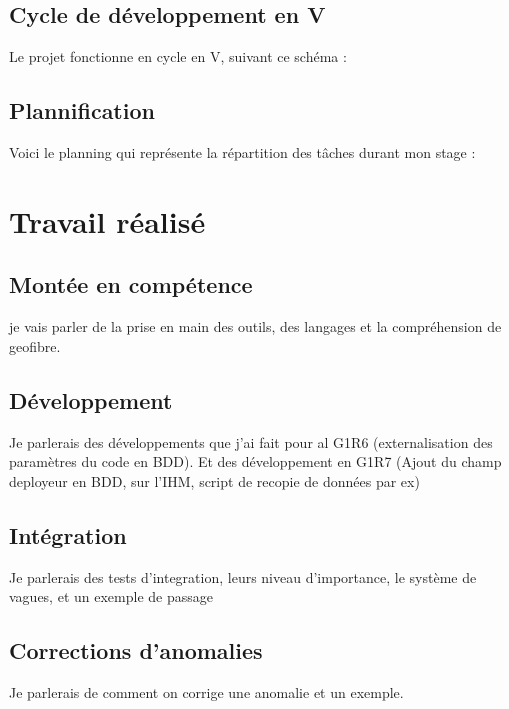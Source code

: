 \section{Cycle de développement en V}
Le projet fonctionne en cycle en V, suivant ce schéma :
\begin{figure}
\end{figure}
\section{Plannification}
Voici le planning qui représente la répartition des tâches durant mon stage :

\chapter{Travail réalisé}
\section{Montée en compétence}
je vais parler de la prise en main des outils, des langages et la compréhension de geofibre.
\section{Développement}
Je parlerais des développements que j'ai fait pour al G1R6 (externalisation des paramètres du code en BDD).
Et des développement en G1R7 (Ajout du champ deployeur en BDD, sur l'IHM, script de recopie de données par ex)
\section{Intégration}
Je parlerais des tests d'integration, leurs niveau d'importance, le système de vagues, et un exemple de passage
\section{Corrections d'anomalies}
Je parlerais de comment on corrige une anomalie et un exemple.
